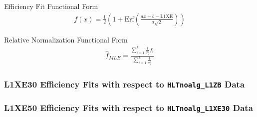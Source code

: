 \documentclass[]{beamer}
\begin{document}
\begin{frame}{Efficiency Fit Functional Form}
        \begin{align}
        f(x)=\frac{1}{2}\left( 1+\mathrm{Erf}\left( \frac{ax+b-\mathrm{L1XE}}{\sigma \sqrt{2}} \right) \right)
        \end{align}
\end{frame}
\begin{frame}{Relative Normalization Functional Form}
        \begin{align}
                \hat{f}_{MLE}=\frac{\sum_{i=1}^k \frac{1}{\sigma_i^2}f_i}{\sum_{i=1}^k \frac{1}{\sigma_i^2}}
        \end{align}
\end{frame}
\begin{frame}
        \frametitle{L1XE30 Efficiency Fits with respect to \texttt{HLTnoalg\_L1ZB} Data}
\end{frame}
\begin{frame}
        \frametitle{L1XE50 Efficiency Fits with respect to \texttt{HLTnoalg\_L1XE30} Data}
\end{frame}
\begin{frame}

\end{frame}
\end{document}
